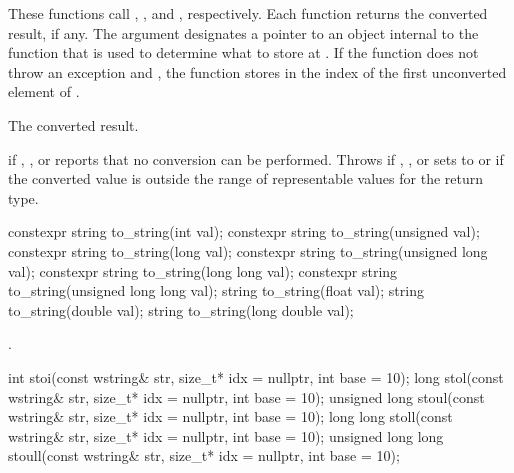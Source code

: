 \begin{itemdescr}
\pnum
\effects
These functions call
, , and
, respectively. Each function returns
the converted result, if any. The argument  designates a pointer to
an object internal to the function that is used to determine what to store at
. If the function does not throw an exception and ,
the function stores in  the index of the first unconverted element
of .

\pnum
\returns
The converted result.

\pnum
\throws
{} if , , or
 reports that no conversion can be performed. Throws
 if , , or
 sets  to 
or if the converted value is outside the range of representable
values for the return type.
\end{itemdescr}

%
\begin{itemdecl}
constexpr string to_string(int val);
constexpr string to_string(unsigned val);
constexpr string to_string(long val);
constexpr string to_string(unsigned long val);
constexpr string to_string(long long val);
constexpr string to_string(unsigned long long val);
string to_string(float val);
string to_string(double val);
string to_string(long double val);
\end{itemdecl}

\begin{itemdescr}
\pnum
\returns
{}.
\end{itemdescr}

%
%
%
%
%
\begin{itemdecl}
int stoi(const wstring& str, size_t* idx = nullptr, int base = 10);
long stol(const wstring& str, size_t* idx = nullptr, int base = 10);
unsigned long stoul(const wstring& str, size_t* idx = nullptr, int base = 10);
long long stoll(const wstring& str, size_t* idx = nullptr, int base = 10);
unsigned long long stoull(const wstring& str, size_t* idx = nullptr, int base = 10);
\end{itemdecl}

